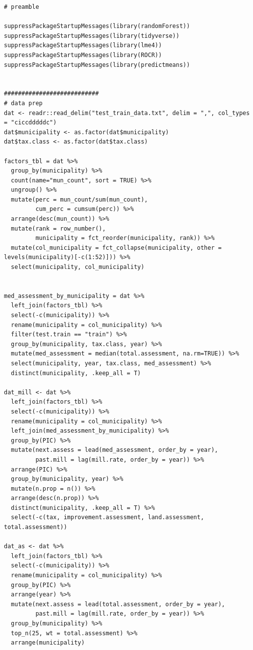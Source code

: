\documentclass{article}
\begin{document}
\begin{lstlisting}[style=R, caption={Code used for the modeling.}, captionpos=b]
# preamble

suppressPackageStartupMessages(library(randomForest))
suppressPackageStartupMessages(library(tidyverse))
suppressPackageStartupMessages(library(lme4))
suppressPackageStartupMessages(library(ROCR))
suppressPackageStartupMessages(library(predictmeans))


###########################
# data prep
dat <- readr::read_delim("test_train_data.txt", delim = ",", col_types = "ciccdddddc")
dat$municipality <- as.factor(dat$municipality)
dat$tax.class <- as.factor(dat$tax.class)

factors_tbl = dat %>% 
  group_by(municipality) %>% 
  count(name="mun_count", sort = TRUE) %>% 
  ungroup() %>% 
  mutate(perc = mun_count/sum(mun_count),
         cum_perc = cumsum(perc)) %>% 
  arrange(desc(mun_count)) %>% 
  mutate(rank = row_number(),
         municipality = fct_reorder(municipality, rank)) %>% 
  mutate(col_municipality = fct_collapse(municipality, other = levels(municipality)[-c(1:52)])) %>% 
  select(municipality, col_municipality)


med_assessment_by_municipality = dat %>% 
  left_join(factors_tbl) %>% 
  select(-c(municipality)) %>% 
  rename(municipality = col_municipality) %>% 
  filter(test.train == "train") %>% 
  group_by(municipality, tax.class, year) %>% 
  mutate(med_assessment = median(total.assessment, na.rm=TRUE)) %>% 
  select(municipality, year, tax.class, med_assessment) %>% 
  distinct(municipality, .keep_all = T)

dat_mill <- dat %>% 
  left_join(factors_tbl) %>% 
  select(-c(municipality)) %>% 
  rename(municipality = col_municipality) %>% 
  left_join(med_assessment_by_municipality) %>% 
  group_by(PIC) %>% 
  mutate(next.assess = lead(med_assessment, order_by = year),
         past.mill = lag(mill.rate, order_by = year)) %>%
  arrange(PIC) %>% 
  group_by(municipality, year) %>% 
  mutate(n.prop = n()) %>% 
  arrange(desc(n.prop)) %>% 
  distinct(municipality, .keep_all = T) %>% 
  select(-c(tax, improvement.assessment, land.assessment, total.assessment))

dat_as <- dat %>% 
  left_join(factors_tbl) %>% 
  select(-c(municipality)) %>% 
  rename(municipality = col_municipality) %>% 
  group_by(PIC) %>% 
  arrange(year) %>% 
  mutate(next.assess = lead(total.assessment, order_by = year),
         past.mill = lag(mill.rate, order_by = year)) %>% 
  group_by(municipality) %>% 
  top_n(25, wt = total.assessment) %>% 
  arrange(municipality)


\end{lstlisting}
\end{document}
